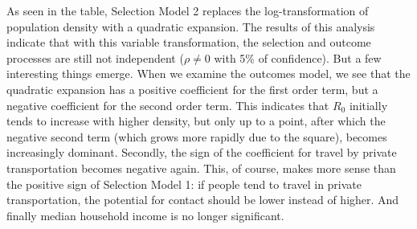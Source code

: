 \documentclass[]{elsarticle} %
\begin{document}
As seen in the table, Selection Model 2 replaces the log-transformation
of population density with a quadratic expansion. The results of this
analysis indicate that with this variable transformation, the selection
and outcome processes are still not independent (\(\rho\ne0\) with 5\%
of confidence). But a few interesting things emerge. When we examine the
outcomes model, we see that the quadratic expansion has a positive
coefficient for the first order term, but a negative coefficient for the
second order term. This indicates that \(R_0\) initially tends to
increase with higher density, but only up to a point, after which the
negative second term (which grows more rapidly due to the square),
becomes increasingly dominant. Secondly, the sign of the coefficient for
travel by private transportation becomes negative again. This, of
course, makes more sense than the positive sign of Selection Model 1: if
people tend to travel in private transportation, the potential for
contact should be lower instead of higher. And finally median household
income is no longer significant.
\end{document}
